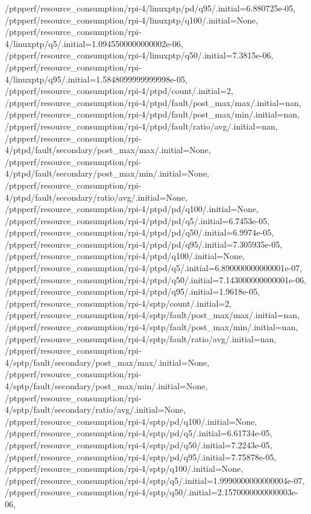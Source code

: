 {    /ptpperf/resource_consumption/rpi-4/linuxptp/pd/q95/.initial=6.880725e-05,
    /ptpperf/resource_consumption/rpi-4/linuxptp/q100/.initial=None,
    /ptpperf/resource_consumption/rpi-4/linuxptp/q5/.initial=1.0945500000000002e-06,
    /ptpperf/resource_consumption/rpi-4/linuxptp/q50/.initial=7.3815e-06,
    /ptpperf/resource_consumption/rpi-4/linuxptp/q95/.initial=1.5848099999999998e-05,
    /ptpperf/resource_consumption/rpi-4/ptpd/count/.initial=2,
    /ptpperf/resource_consumption/rpi-4/ptpd/fault/post_max/max/.initial=nan,
    /ptpperf/resource_consumption/rpi-4/ptpd/fault/post_max/min/.initial=nan,
    /ptpperf/resource_consumption/rpi-4/ptpd/fault/ratio/avg/.initial=nan,
    /ptpperf/resource_consumption/rpi-4/ptpd/fault/secondary/post_max/max/.initial=None,
    /ptpperf/resource_consumption/rpi-4/ptpd/fault/secondary/post_max/min/.initial=None,
    /ptpperf/resource_consumption/rpi-4/ptpd/fault/secondary/ratio/avg/.initial=None,
    /ptpperf/resource_consumption/rpi-4/ptpd/pd/q100/.initial=None,
    /ptpperf/resource_consumption/rpi-4/ptpd/pd/q5/.initial=6.7453e-05,
    /ptpperf/resource_consumption/rpi-4/ptpd/pd/q50/.initial=6.9974e-05,
    /ptpperf/resource_consumption/rpi-4/ptpd/pd/q95/.initial=7.305935e-05,
    /ptpperf/resource_consumption/rpi-4/ptpd/q100/.initial=None,
    /ptpperf/resource_consumption/rpi-4/ptpd/q5/.initial=6.890000000000001e-07,
    /ptpperf/resource_consumption/rpi-4/ptpd/q50/.initial=7.143000000000001e-06,
    /ptpperf/resource_consumption/rpi-4/ptpd/q95/.initial=1.9618e-05,
    /ptpperf/resource_consumption/rpi-4/sptp/count/.initial=2,
    /ptpperf/resource_consumption/rpi-4/sptp/fault/post_max/max/.initial=nan,
    /ptpperf/resource_consumption/rpi-4/sptp/fault/post_max/min/.initial=nan,
    /ptpperf/resource_consumption/rpi-4/sptp/fault/ratio/avg/.initial=nan,
    /ptpperf/resource_consumption/rpi-4/sptp/fault/secondary/post_max/max/.initial=None,
    /ptpperf/resource_consumption/rpi-4/sptp/fault/secondary/post_max/min/.initial=None,
    /ptpperf/resource_consumption/rpi-4/sptp/fault/secondary/ratio/avg/.initial=None,
    /ptpperf/resource_consumption/rpi-4/sptp/pd/q100/.initial=None,
    /ptpperf/resource_consumption/rpi-4/sptp/pd/q5/.initial=6.61734e-05,
    /ptpperf/resource_consumption/rpi-4/sptp/pd/q50/.initial=7.2243e-05,
    /ptpperf/resource_consumption/rpi-4/sptp/pd/q95/.initial=7.75878e-05,
    /ptpperf/resource_consumption/rpi-4/sptp/q100/.initial=None,
    /ptpperf/resource_consumption/rpi-4/sptp/q5/.initial=1.9990000000000004e-07,
    /ptpperf/resource_consumption/rpi-4/sptp/q50/.initial=2.1570000000000003e-06,
}
